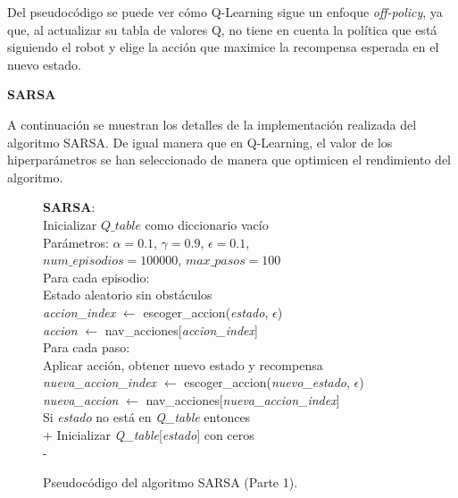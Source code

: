 \documentclass[conference,a4paper]{IEEEtran}
\begin{document}
Del pseudocódigo se puede ver cómo Q-Learning sigue un enfoque \textit{off-policy}, ya que, al actualizar su tabla de valores Q,
no tiene en cuenta la política que está siguiendo el robot y elige la acción que maximice la recompensa esperada en el nuevo estado.\newline

\textbf{SARSA\newline}

A continuación se muestran los detalles de la implementación realizada del algoritmo SARSA. De igual manera que en Q-Learning, el valor de los hiperparámetros
se han seleccionado de manera que optimicen el rendimiento del algoritmo. 

\begin{figure}[!h]
  \begin{minipage}{\linewidth}
  \begin{pseudo}
  \textbf{SARSA}: \\
  Inicializar $Q\_table$ como diccionario vacío \\
  Parámetros: $\alpha = 0.1$, $\gamma = 0.9$, $\epsilon = 0.1$, \\ $num\_episodios = 100000$, $max\_pasos = 100$ \\
  Para cada episodio: \\
  \> Estado aleatorio sin obstáculos \\
  \> \textit{accion\_index} $\leftarrow$ escoger\_accion(\textit{estado}, $\epsilon$) \\
  \> \textit{accion} $\leftarrow$ nav\_acciones[\textit{accion\_index}] \\
  \> Para cada paso: \\
  \> \> Aplicar acción, obtener nuevo estado y recompensa \\
  \> \> \textit{nueva\_accion\_index} $\leftarrow$ escoger\_accion(\textit{nuevo\_estado}, $\epsilon$) \\
  \> \> \textit{nueva\_accion} $\leftarrow$ nav\_acciones[\textit{nueva\_accion\_index}] \\
  Si \textit{estado} \textnormal{no está en} \textit{Q\_table} entonces \\+
  Inicializar \textit{Q\_table}[\textit{estado}] con ceros \\-

  \end{pseudo}
  \end{minipage}
  \caption{Pseudocódigo del algoritmo SARSA (Parte 1).}
  \label{fig:sarsa1}
\end{figure}
\end{document}
